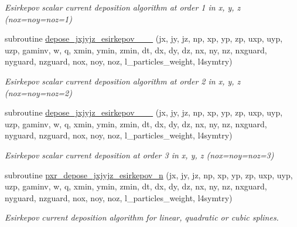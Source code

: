 \begin{DoxyCompactItemize}
\begin{DoxyCompactList}\small\item\em Esirkepov scalar current deposition algorithm at order 1 in x, y, z (nox=noy=noz=1) \end{DoxyCompactList}\item 
subroutine \hyperlink{current__deposition_8_f90_a1b0279f68e8d25ed75dea74ec525c04b}{depose\+\_\+jxjyjz\+\_\+esirkepov\+\_\+\_\+\_} (jx, jy, jz, np, xp, yp, zp, uxp, uyp, uzp, gaminv, w, q, xmin, ymin, zmin,                                                                                                                                                   dt, dx, dy, dz, nx, ny, nz, nxguard, nyguard, nzguard,                                                                                                                                                   nox, noy, noz, l\+\_\+particles\+\_\+weight, l4symtry)
\begin{DoxyCompactList}\small\item\em Esirkepov scalar current deposition algorithm at order 2 in x, y, z (nox=noy=noz=2) \end{DoxyCompactList}\item 
subroutine \hyperlink{current__deposition_8_f90_a764fd99e306237a96ae8675235ca96bb}{depose\+\_\+jxjyjz\+\_\+esirkepov\+\_\+\_\+\_} (jx, jy, jz, np, xp, yp, zp, uxp, uyp, uzp, gaminv, w, q, xmin, ymin, zmin,                                                                                                                                                   dt, dx, dy, dz, nx, ny, nz, nxguard, nyguard, nzguard,                                                                                                                                                   nox, noy, noz, l\+\_\+particles\+\_\+weight, l4symtry)
\begin{DoxyCompactList}\small\item\em Esirkepov scalar current deposition at order 3 in x, y, z (nox=noy=noz=3) \end{DoxyCompactList}\item 
subroutine \hyperlink{current__deposition_8_f90_addb36b5ec8b753baa5098db4d6de7820}{pxr\+\_\+depose\+\_\+jxjyjz\+\_\+esirkepov\+\_\+n} (jx, jy, jz, np, xp, yp, zp, uxp, uyp, uzp, gaminv, w, q, xmin, ymin, zmin, dt, dx, dy, dz, nx, ny, nz, nxguard, nyguard, nzguard, nox, noy, noz, l\+\_\+particles\+\_\+weight, l4symtry)
\begin{DoxyCompactList}\small\item\em Esirkepov current deposition algorithm for linear, quadratic or cubic splines. \end{DoxyCompactList}\item 

\end{DoxyCompactItemize}
